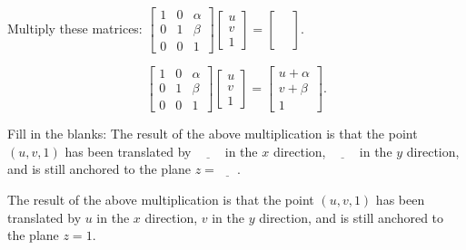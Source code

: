 \documentclass[../key.tex]{subfiles}
\begin{document}
\begin{inner_problem}[start=1]
\item Multiply these matrices: $\left[\begin{array}{ccc} 1 & 0 & \alpha \\ 0 & 1 & \beta \\ 0 & 0 & 1 \end{array}\right]\left[\begin{array}{c}u \\ v \\ 1 \end{array}\right]=\left[\begin{array}{c}\phantom{u} \\ \phantom{v} \\ \phantom{1}\end{array}\right].$ \label{prob:translation_matrix}
\end{inner_problem}

$$\begin{bmatrix} 1 & 0 & \alpha \\ 0 & 1 & \beta \\ 0 & 0 & 1 \end{bmatrix} \begin{bmatrix}u \\ v \\ 1 \end{bmatrix} = \begin{bmatrix} u + \alpha \\ v + \beta \\ 1 \end{bmatrix}.$$

\begin{inner_problem}
\item Fill in the blanks: The result of the above multiplication is that the point $(u,v,1)$ has been translated by $\underline{\phantom{0000}}$ in the $x$ direction, $\underline{\phantom{0000}}$ in the $y$ direction, and is still anchored to the plane $z=\underline{\phantom{000}}$.
\end{inner_problem}

The result of the above multiplication is that the point $(u,v,1)$ has been translated by \underline{$u$} in the $x$ direction, \underline{$v$} in the $y$ direction, and is still anchored to the plane $z=$\underline{$1$}.

\begin{outer_problem}
\item
\end{outer_problem}
\end{document}
